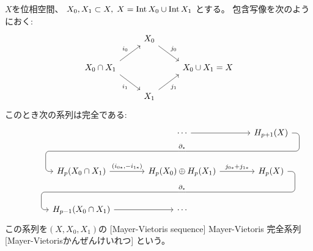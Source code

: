 \documentclass[report]{jlreq}
\begin{document}
\begin{theorem}
    $X$を位相空間、
    $X_0, X_1 \subset X, \; X = \operatorname{Int} X_0 \cup \operatorname{Int} X_1$
    とする。
    包含写像を次のようにおく:
    \begin{equation}
        \begin{tikzcd}
            & X_0 \ar[end anchor=north west]{dr}{j_0} \\
            X_0 \cap X_1
                \ar[start anchor=north east]{ur}{i_0}
                \ar[start anchor=south east]{dr}[swap]{i_1}
                & & X_0 \cup X_1 = X \\
            & X_1 \ar[end anchor=south west]{ur}[swap]{j_1}
        \end{tikzcd}
    \end{equation}
    このとき次の系列は完全である:
    \begin{equation}
        \begin{tikzcd}[column sep=large, row sep=large]
            && \cdots
                \ar{r} \ar[phantom]{d}[name=X1, anchor=center]{}
                & H_{p+1}(X)
                    \ar[rounded corners,
                        to path={
                            -- ([xshift=2ex]\tikztostart.east)
                            |- (X1.center) \tikztonodes
                            -| ([xshift=-2ex]\tikztotarget.west)
                            -- (\tikztotarget)
                        }]{dll}[at end, swap]{\partial_*} \\
            & H_p(X_0 \cap X_1)
                \ar{r}{(i_{0*}, -i_{1*})}
                & H_p(X_0) \oplus H_p(X_1)
                    \ar{r}{j_{0*} + j_{1*}}
                    \ar[phantom]{d}[name=X2, anchor=center]{}
                & H_p(X)
                    \ar[rounded corners,
                        to path={
                            -- ([xshift=2ex]\tikztostart.east)
                            |- (X2.center) \tikztonodes
                            -| ([xshift=-2ex]\tikztotarget.west)
                            -- (\tikztotarget)
                        }]{dll}[at end, swap]{\partial_*} \\
            & H_{p-1}(X_0 \cap X_1)
                \ar{r}
                & \cdots
        \end{tikzcd}
    \end{equation}
    この系列を$(X, X_0, X_1)$の
    [Mayer-Vietoris sequence]
    {Mayer-Vietoris 完全系列}[Mayer-Vietorisかんぜんけいれつ]
    という。
\end{theorem}
\end{document}
